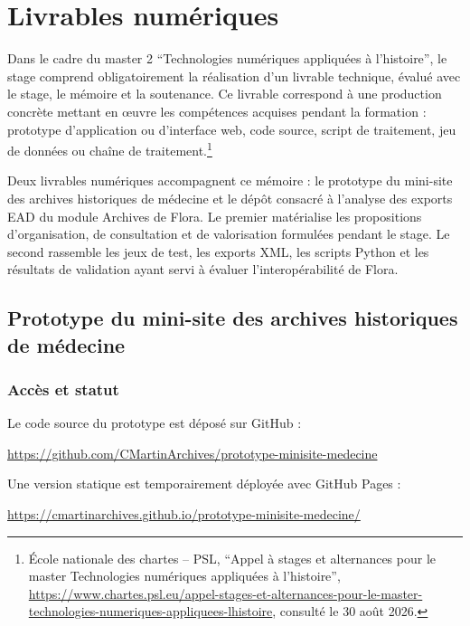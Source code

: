 \chapter{Livrables numériques}
\label{annexe:livrables-numeriques}

Dans le cadre du master 2 \enquote{Technologies numériques appliquées à l'histoire}, le stage comprend obligatoirement la réalisation d'un livrable technique, évalué avec le stage, le mémoire et la soutenance. Ce livrable correspond à une production concrète mettant en œuvre les compétences acquises pendant la formation : prototype d'application ou d'interface web, code source, script de traitement, jeu de données ou chaîne de traitement.\footnote{École nationale des chartes -- PSL, \enquote{Appel à stages et alternances pour le master Technologies numériques appliquées à l'histoire}, \url{https://www.chartes.psl.eu/appel-stages-et-alternances-pour-le-master-technologies-numeriques-appliquees-lhistoire}, consulté le 30 août 2026.}

Deux livrables numériques accompagnent ce mémoire : le prototype du mini-site des archives historiques de médecine et le dépôt consacré à l'analyse des exports EAD du module Archives de Flora. Le premier matérialise les propositions d'organisation, de consultation et de valorisation formulées pendant le stage. Le second rassemble les jeux de test, les exports XML, les scripts Python et les résultats de validation ayant servi à évaluer l'interopérabilité de Flora.

\clearpage
\section{Prototype du mini-site des archives historiques de médecine}
\label{annexe:prototype-mini-site}

\subsection{Accès et statut}

Le code source du prototype est déposé sur GitHub :

\begin{center}
	\url{https://github.com/CMartinArchives/prototype-minisite-medecine}
\end{center}

Une version statique est temporairement déployée avec GitHub Pages :

\begin{center}
	\url{https://cmartinarchives.github.io/prototype-minisite-medecine/}
\end{center}

